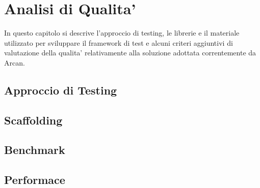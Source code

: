 \chapter{Analisi di Qualita'}

In questo capitolo si descrive l'approccio di testing, le librerie e il materiale utilizzato per sviluppare il framework di test e alcuni criteri aggiuntivi di valutazione della qualita' relativamente alla soluzione adottata correntemente da Arcan.

\section{Approccio di Testing}

\section{Scaffolding}

\section{Benchmark}

\section{Performace}
